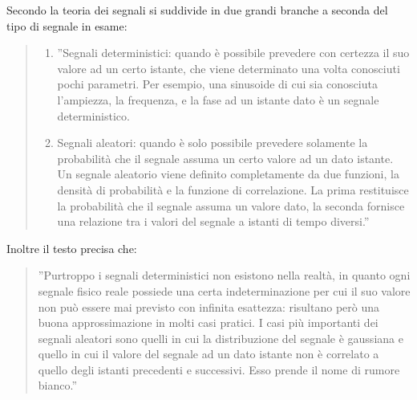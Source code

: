 \documentclass[a4paper]{report} %
\begin{document}
Secondo \cite{art:rif.2} la teoria dei segnali si suddivide in due grandi branche a seconda del tipo di segnale in esame: 
\begin{quote}
	\begin{enumerate}
		\item ''Segnali deterministici: quando è possibile prevedere con certezza il suo valore ad un certo istante, che viene determinato una volta conosciuti pochi parametri. Per esempio, una sinusoide di cui sia conosciuta l'ampiezza, la frequenza, e la fase ad un istante dato è un segnale deterministico. 
		\item Segnali aleatori: quando è solo possibile prevedere solamente la probabilità che il segnale assuma un certo valore ad un dato istante. Un segnale aleatorio viene definito completamente da due funzioni, la densità di probabilità e la funzione di correlazione. La prima restituisce la probabilità che il segnale assuma un valore dato, la seconda fornisce una relazione tra i valori del segnale a istanti di tempo diversi.''
	\end{enumerate}
\end{quote}
Inoltre il testo precisa che:
\begin{quote}
	''Purtroppo i segnali deterministici non esistono nella realtà, in quanto ogni segnale fisico reale possiede una certa indeterminazione per cui il suo valore non può essere mai previsto con infinita esattezza: risultano però una buona approssimazione in molti casi pratici.
	I casi più importanti dei segnali aleatori sono quelli in cui la distribuzione del segnale è gaussiana e quello in cui il valore del segnale ad un dato istante non è correlato a quello degli istanti precedenti e successivi. Esso prende il nome di rumore bianco.''
\end{quote}
 
\end{document}
